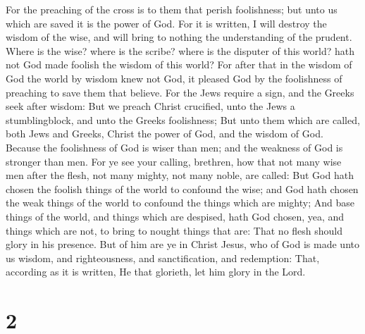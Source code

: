  For the preaching of the cross is to them that perish
foolishness; but unto us which are saved it is the power of God.
 For it is written, I will destroy the wisdom of the
wise, and will bring to nothing the understanding of the prudent.
 Where is the wise? where is the scribe? where is the
disputer of this world? hath not God made foolish the wisdom of this
world?  For after that in the wisdom of God the world by
wisdom knew not God, it pleased God by the foolishness of preaching to
save them that believe.  For the Jews require a sign, and
the Greeks seek after wisdom:  But we preach Christ
crucified, unto the Jews a stumblingblock, and unto the Greeks
foolishness;  But unto them which are called, both Jews
and Greeks, Christ the power of God, and the wisdom of God.
 Because the foolishness of God is wiser than men; and
the weakness of God is stronger than men.  For ye see
your calling, brethren, how that not many wise men after the flesh, not
many mighty, not many noble, are called:  But God hath
chosen the foolish things of the world to confound the wise; and God
hath chosen the weak things of the world to confound the things which
are mighty;  And base things of the world, and things
which are despised, hath God chosen, yea, and things which are not, to
bring to nought things that are:  That no flesh should
glory in his presence.  But of him are ye in Christ
Jesus, who of God is made unto us wisdom, and righteousness, and
sanctification, and redemption:  That, according as it is
written, He that glorieth, let him glory in the Lord.

\hypertarget{section-1}{%
\section{2}\label{section-1}}

